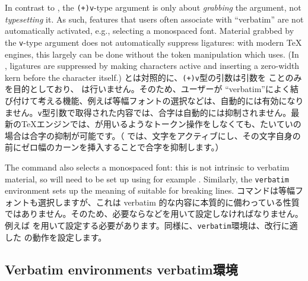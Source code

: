 \documentclass{ltxguide}
\newcommand\jpnewline{\vspace{3pt}\newline}
\DeclareRobustCommand{\jpemph}[1]{%
  \underLine{#1}%
}
\begin{document}
In contrast to , the \texttt{(+)v}-type argument is only about
\emph{grabbing} the argument, not \emph{typesetting} it. As such, features that
users often associate with \enquote{verbatim} are not automatically activated,
e.g., selecting a monospaced font. Material grabbed by the \texttt{v}-type
argument does not automatically suppress ligatures: with modern \TeX{} engines,
this largely can be done without the token manipulation which  uses.
(In , ligatures are suppressed by making characters active and
inserting a zero-width kern before the character itself.)
\jpnewline
{}とは対照的に、\texttt{(+)v}型の引数は引数を\jpemph{取りこむ}ことのみを目的としており、\jpemph{組版}は行いません。そのため、ユーザーが \enquote{verbatim}によく結び付けて考える機能、例えば等幅フォントの選択などは、自動的には有効になりません。\texttt{v}型引数で取得された内容では、合字は自動的には抑制されません。最新の\TeX{}エンジンでは、が用いるようなトークン操作をしなくても、たいていの場合は合字の抑制が可能です。（ では、文字をアクティブにし、その文字自身の前にゼロ幅のカーンを挿入することで合字を抑制します。）

The  command also selects a monospaced font: this is not intrinsic to
verbatim material, so will need to be set up using for example .
Similarly, the \texttt{verbatim} environment sets up the meaning of 
suitable for breaking lines.
\jpnewline
{}コマンドは等幅フォントも選択しますが、これは verbatim 的な内容に本質的に備わっている性質ではありません。そのため、必要ならなどを用いて設定しなければなりません。例えば を用いて設定する必要があります。同様に、\texttt{verbatim}環境は、改行に適した の動作を設定します。

\subsection{Verbatim environments
verbatim環境}
\label{sec:cmd:verbenv}
\end{document}
